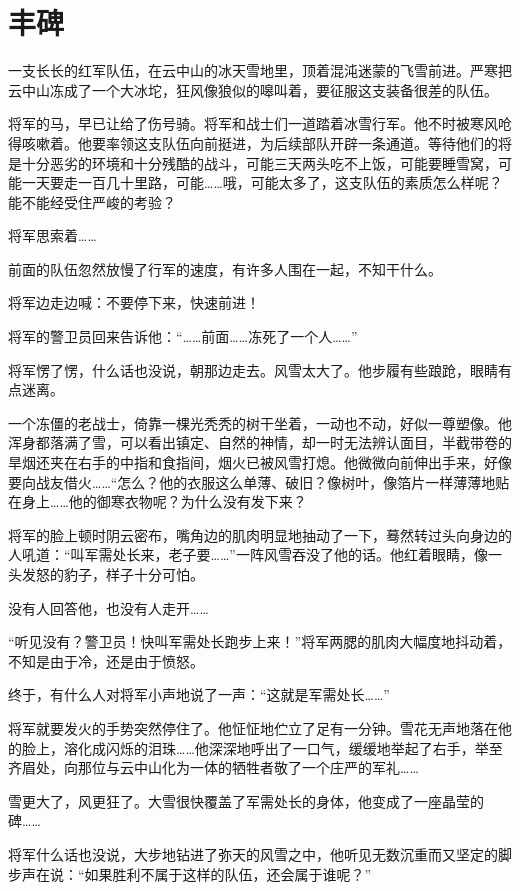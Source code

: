 \documentclass[12pt,UTF-8,openany]{ctexbook}
\begin{document}
\chapter{丰碑}

\begin{Large}
    
    一支长长的红军队伍，在云中山的冰天雪地里，顶着混沌迷蒙的飞雪前进。严寒把云中山冻成了一个大冰坨，狂风像狼似的嗥叫着，要征服这支装备很差的队伍。
    
    将军的马，早已让给了伤号骑。将军和战士们一道踏着冰雪行军。他不时被寒风呛得咳嗽着。他要率领这支队伍向前挺进，为后续部队开辟一条通道。等待他们的将是十分恶劣的环境和十分残酷的战斗，可能三天两头吃不上饭，可能要睡雪窝，可能一天要走一百几十里路，可能……哦，可能太多了，这支队伍的素质怎么样呢？能不能经受住严峻的考验？
    
    将军思索着……
    
    前面的队伍忽然放慢了行军的速度，有许多人围在一起，不知干什么。
    
    将军边走边喊：不要停下来，快速前进！
    
    将军的警卫员回来告诉他：“……前面……冻死了一个人……”
    
    将军愣了愣，什么话也没说，朝那边走去。风雪太大了。他步履有些踉跄，眼睛有点迷离。
    
    一个冻僵的老战士，倚靠一棵光秃秃的树干坐着，一动也不动，好似一尊塑像。他浑身都落满了雪，可以看出镇定、自然的神情，却一时无法辨认面目，半截带卷的旱烟还夹在右手的中指和食指间，烟火已被风雪打熄。他微微向前伸出手来，好像要向战友借火……“怎么？他的衣服这么单薄、破旧？像树叶，像箔片一样薄薄地贴在身上……他的御寒衣物呢？为什么没有发下来？
    
    将军的脸上顿时阴云密布，嘴角边的肌肉明显地抽动了一下，蓦然转过头向身边的人吼道：“叫军需处长来，老子要……”一阵风雪吞没了他的话。他红着眼睛，像一头发怒的豹子，样子十分可怕。
    
    没有人回答他，也没有人走开……
    
    “听见没有？警卫员！快叫军需处长跑步上来！”将军两腮的肌肉大幅度地抖动着，不知是由于冷，还是由于愤怒。
    
    终于，有什么人对将军小声地说了一声：“这就是军需处长……”
    
    将军就要发火的手势突然停住了。他怔怔地伫立了足有一分钟。雪花无声地落在他的脸上，溶化成闪烁的泪珠……他深深地呼出了一口气，缓缓地举起了右手，举至齐眉处，向那位与云中山化为一体的牺牲者敬了一个庄严的军礼……
    
    雪更大了，风更狂了。大雪很快覆盖了军需处长的身体，他变成了一座晶莹的碑……
    
    将军什么话也没说，大步地钻进了弥天的风雪之中，他听见无数沉重而又坚定的脚步声在说：“如果胜利不属于这样的队伍，还会属于谁呢？”
    
\end{Large}
\end{document}
